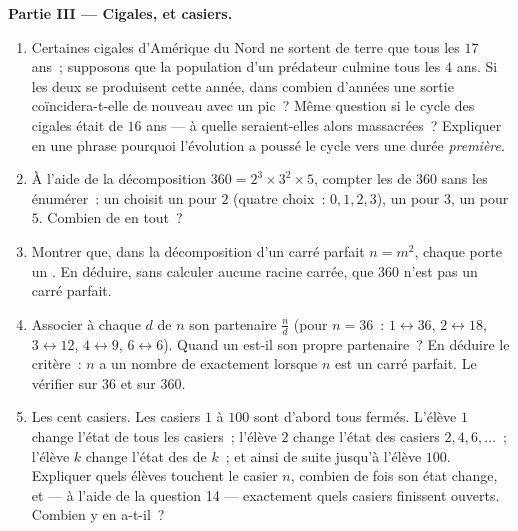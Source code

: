 \begin{problem}
\medskip
\noindent\textbf{Partie III --- Cigales,  et casiers.}
\begin{enumerate}[resume]
  \item Certaines cigales d'Amérique du Nord ne sortent de terre que
        tous les $17$ ans~; supposons que la population d'un
        prédateur culmine tous les $4$ ans. Si les deux se
        produisent cette année, dans combien d'années une sortie
        coïncidera-t-elle de nouveau avec un pic~? Même question si
        le cycle des cigales était de $16$ ans --- à quelle
         seraient-elles alors massacrées~? Expliquer en une
        phrase pourquoi l'évolution a poussé le cycle vers une durée
        \emph{première}.
  \item À l'aide de la décomposition
        $360 = 2^3 \times 3^2 \times 5$, compter les  de
        $360$ sans les énumérer~: un  choisit un 
        pour $2$ (quatre choix~: $0, 1, 2, 3$), un pour $3$, un pour
        $5$. Combien de  en tout~?
  \item Montrer que, dans la décomposition d'un carré parfait
        $n = m^2$, chaque  porte un 
        \emph{}. En déduire, sans calculer aucune racine carrée,
        que $360$ n'est pas un carré parfait.
  \item Associer à chaque  $d$ de $n$ son partenaire
        $\frac{n}{d}$ (pour $n = 36$~: $1 \leftrightarrow 36$,
        $2 \leftrightarrow 18$, $3 \leftrightarrow 12$,
        $4 \leftrightarrow 9$, $6 \leftrightarrow 6$). Quand un
         est-il son propre partenaire~? En déduire le
        critère~: $n$ a un nombre \emph{} de 
        exactement lorsque $n$ est un carré parfait. Le vérifier sur
        $36$ et sur $360$.
  \item Les cent casiers. Les casiers $1$ à $100$ sont d'abord tous
        fermés. L'élève $1$ change l'état de tous les casiers~;
        l'élève $2$ change l'état des casiers $2, 4, 6, \dots$~;
        l'élève $k$ change l'état des  de $k$~; et ainsi de
        suite jusqu'à l'élève $100$. Expliquer quels élèves touchent
        le casier $n$, combien de fois son état change, et --- à
        l'aide de la question 14 --- exactement quels casiers
        finissent ouverts. Combien y en a-t-il~?
\end{enumerate}
\end{problem}

